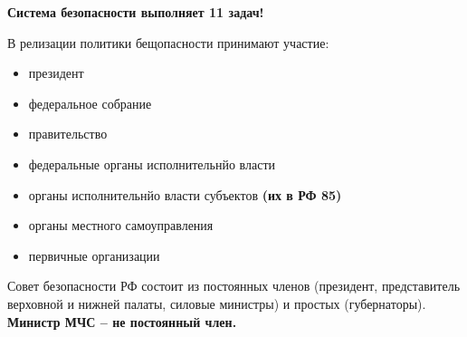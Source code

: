 \textsl{}\documentclass[oneside,final,14pt]{extreport}
\begin{document}
\textbf{Система безопасности выполняет 11 задач!}

В релизации политики бещопасности принимают участие:\begin{itemize}
	\item президент
	\item федеральное собрание
	\item правительство
	\item федеральные органы исполнительнйо власти
	\item органы исполнительнйо власти субъектов \textbf{(их в РФ 85)}
	\item органы местного самоуправления
	\item первичные организации
\end{itemize}

Совет безопасности РФ состоит из постоянных членов (президент, представитель верховной и нижней палаты, силовые министры) и простых (губернаторы). \textbf{Министр МЧС -- не постоянный член.}
\end{document}
